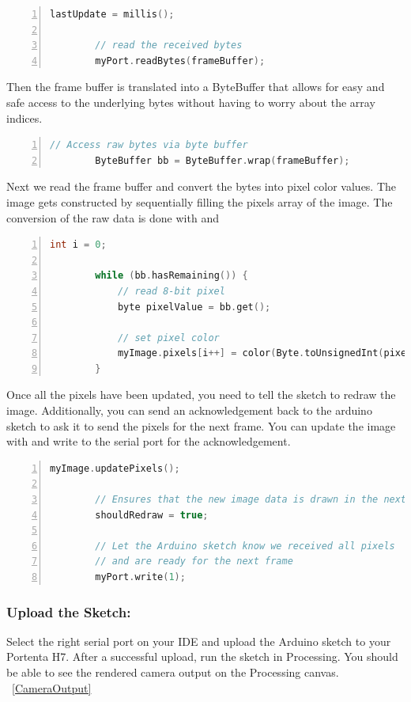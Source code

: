 	\begin{lstlisting}[language=C++, frame=single, numbers=left, basicstyle=\ttfamily\small]
		lastUpdate = millis();
		
		// read the received bytes
		myPort.readBytes(frameBuffer);
	\end{lstlisting}
	
	Then the frame buffer is translated into a ByteBuffer that allows for easy and safe access to the underlying bytes without having to worry about the array indices.
	
	\begin{lstlisting}[language=C++, frame=single, numbers=left, basicstyle=\ttfamily\small]
		// Access raw bytes via byte buffer  
		ByteBuffer bb = ByteBuffer.wrap(frameBuffer);
	\end{lstlisting}
	Next we read the frame buffer and convert the bytes into pixel color values. The image gets constructed by sequentially filling the pixels array of the image. The conversion of the raw data is done with  and 
	
	\begin{lstlisting}[language=C++, frame=single, numbers=left, basicstyle=\ttfamily\small]
		int i = 0;
		
		while (bb.hasRemaining()) {
			// read 8-bit pixel
			byte pixelValue = bb.get();
			
			// set pixel color
			myImage.pixels[i++] = color(Byte.toUnsignedInt(pixelValue));    
		}
	\end{lstlisting}
	
	Once all the pixels have been updated, you need to tell the sketch to redraw the image. Additionally, you can send an acknowledgement back to the arduino sketch to ask it to send the pixels for the next frame. You can update the image with  and write  to the serial port for the acknowledgement.
	
	\begin{lstlisting}[language=C++, frame=single, numbers=left, basicstyle=\ttfamily\small]
		myImage.updatePixels();
		
		// Ensures that the new image data is drawn in the next draw loop
		shouldRedraw = true;
		
		// Let the Arduino sketch know we received all pixels
		// and are ready for the next frame
		myPort.write(1);
	\end{lstlisting}
	
	\subsubsection{Upload the Sketch:} Select the right serial port on your IDE and upload the Arduino sketch to your Portenta H7. After a successful upload, run the  sketch in Processing. You should be able to see the rendered camera output on the Processing canvas. ~\ref{CameraOutput} \cite{portentaVisionShieldCamera:2024}
	
